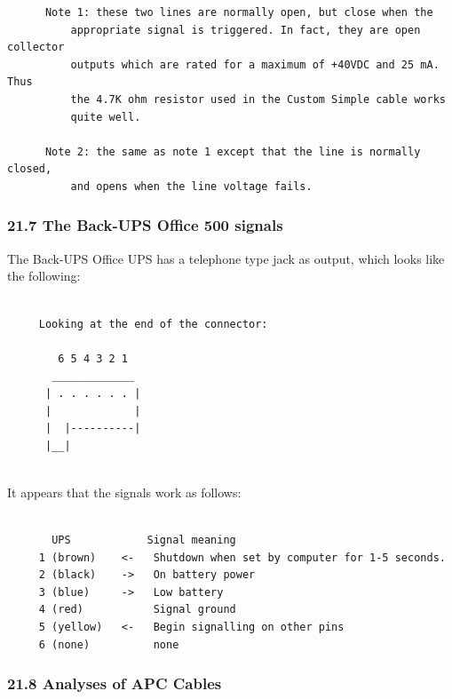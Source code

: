 {{{{{{{{{{\begin{verbatim}
      Note 1: these two lines are normally open, but close when the
          appropriate signal is triggered. In fact, they are open collector
          outputs which are rated for a maximum of +40VDC and 25 mA. Thus
          the 4.7K ohm resistor used in the Custom Simple cable works
          quite well.
     
      Note 2: the same as note 1 except that the line is normally closed,
          and opens when the line voltage fails.
\end{verbatim}
\normalsize

\label{The-Back_002dUPS-Office-500-signals}

\subsubsection*{21.7 The Back-UPS Office 500 signals}

\label{index-Cables_002c-BackUPS-Office-200}
\label{index-BackUPS-Office_002c-cables-201}
The Back-UPS Office UPS has a telephone type jack as output, which looks like
the following: 

\footnotesize
\begin{verbatim}
     
     Looking at the end of the connector:
     
        6 5 4 3 2 1
       _____________
      | . . . . . . |
      |             |
      |  |----------|
      |__|
     
\end{verbatim}
\normalsize

It appears that the signals work as follows: 

\footnotesize
\begin{verbatim}
     
       UPS            Signal meaning
     1 (brown)    <-   Shutdown when set by computer for 1-5 seconds.
     2 (black)    ->   On battery power
     3 (blue)     ->   Low battery
     4 (red)           Signal ground
     5 (yellow)   <-   Begin signalling on other pins
     6 (none)          none
\end{verbatim}
\normalsize

\label{Analyses-of-APC-Cables}

\subsubsection*{21.8 Analyses of APC Cables}

}}}}}}}}}}
